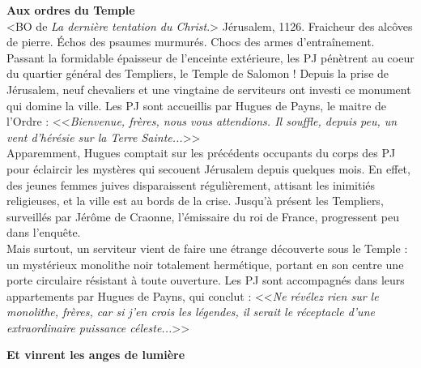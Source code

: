 \documentclass[11pt,twoside,a4paper]{book}
\begin{document}
\textbf{\large Aux ordres du Temple}~\\

<BO de \emph{La derni{\`e}re tentation du Christ}.> J{\'e}rusalem, 1126. Fraicheur des alc{\^o}ves de pierre. {\'E}chos des psaumes murmur{\'e}s. Chocs des armes d'entra{\^i}nement. Passant la formidable {\'e}paisseur de l'enceinte ext{\'e}rieure, les PJ p{\'e}n{\`e}trent au coeur du quartier g{\'e}n{\'e}ral des Templiers, le Temple de Salomon ! Depuis la prise de J{\'e}rusalem, neuf chevaliers et une vingtaine de serviteurs ont investi ce monument qui domine la ville. Les PJ sont accueillis par Hugues de Payns, le maitre de l'Ordre : <<\emph{Bienvenue, fr{\`e}res, nous vous attendions. Il souffle, depuis peu, un vent d'h{\'e}r{\'e}sie sur la Terre Sainte...}>>~\\

Apparemment, Hugues comptait sur les pr{\'e}c{\'e}dents occupants du corps des PJ pour {\'e}claircir les myst{\`e}res qui secouent J{\'e}rusalem depuis quelques mois. En effet, des jeunes femmes juives disparaissent r{\'e}guli{\`e}rement, attisant les inimiti{\'e}s religieuses, et la ville est au bords de la crise. Jusqu'{\`a} pr{\'e}sent les Templiers, surveill{\'e}s par J{\'e}r{\^o}me de Craonne, l'{\'e}missaire du roi de France, progressent peu dans l'enqu{\^e}te.~\\

Mais surtout, un serviteur vient de faire une {\'e}trange d{\'e}couverte sous le Temple : un myst{\'e}rieux monolithe noir totalement herm{\'e}tique, portant en son centre une porte circulaire r{\'e}sistant {\`a} toute ouverture. Les PJ sont accompagn{\'e}s dans leurs appartements par Hugues de Payns, qui conclut : <<\emph{Ne r{\'e}v{\'e}lez rien sur le monolithe, fr{\`e}res, car si j'en crois les l{\'e}gendes, il serait le r{\'e}ceptacle d'une extraordinaire puissance c{\'e}leste...}>>~\\

\clearpage

\textbf{\large Et vinrent les anges de lumi{\`e}re}~\\
\end{document}
